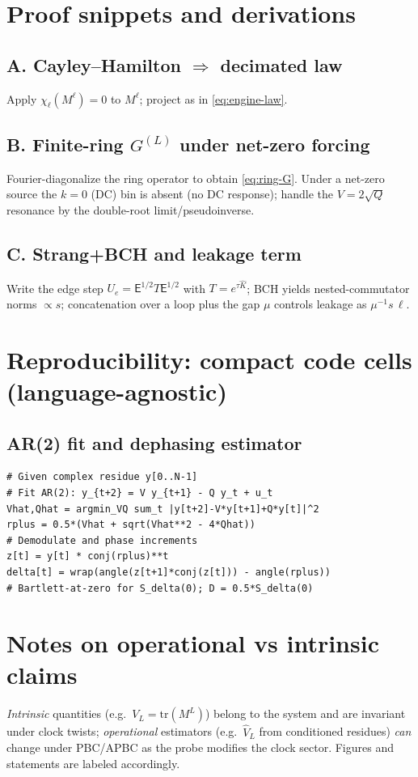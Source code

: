 \documentclass[11pt]{article}
\newcommand{\E}{\mathsf{E}}
\begin{document}
\appendix
\section{Proof snippets and derivations}
\subsection*{A. Cayley--Hamilton $\Rightarrow$ decimated law}
Apply $\chi_\ell(M^\ell)=0$ to $M^\ell$; project as in \eqref{eq:engine-law}.
\subsection*{B. Finite-ring $G^{(L)}$ under net-zero forcing}
Fourier-diagonalize the ring operator to obtain \eqref{eq:ring-G}. Under a net-zero source the $k=0$ (DC) bin is absent (no DC response); handle the $V=2\sqrt{Q}$ resonance by the double-root limit/pseudoinverse.
\subsection*{C. Strang+BCH and leakage term}
Write the edge step $U_e=\E^{1/2} T \E^{1/2}$ with $T=e^{\tau\widehat K}$; BCH yields nested-commutator norms $\propto s$; concatenation over a loop plus the gap $\mu$ controls leakage as $\mu^{-1} s\,\ell$.

\section{Reproducibility: compact code cells (language-agnostic)}
\subsection*{AR(2) fit and dephasing estimator}
\begin{verbatim}
# Given complex residue y[0..N-1]
# Fit AR(2): y_{t+2} = V y_{t+1} - Q y_t + u_t
Vhat,Qhat = argmin_VQ sum_t |y[t+2]-V*y[t+1]+Q*y[t]|^2
rplus = 0.5*(Vhat + sqrt(Vhat**2 - 4*Qhat))
# Demodulate and phase increments
z[t] = y[t] * conj(rplus)**t
delta[t] = wrap(angle(z[t+1]*conj(z[t])) - angle(rplus))
# Bartlett-at-zero for S_delta(0); D = 0.5*S_delta(0)
\end{verbatim}

\section{Notes on operational vs intrinsic claims}
\emph{Intrinsic} quantities (e.g.\ $V_L=\mathrm{tr}(M^L)$) belong to the system and are invariant under clock twists; \emph{operational} estimators (e.g.\ $\widehat V_L$ from conditioned residues) \emph{can} change under PBC/APBC as the probe modifies the clock sector. Figures and statements are labeled accordingly.
\end{document}
